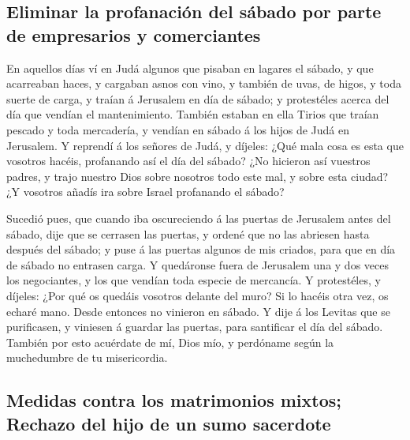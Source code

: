 \hypertarget{eliminar-la-profanaciuxf3n-del-suxe1bado-por-parte-de-empresarios-y-comerciantes}{%
\subsection{Eliminar la profanación del sábado por parte de empresarios
y
comerciantes}\label{eliminar-la-profanaciuxf3n-del-suxe1bado-por-parte-de-empresarios-y-comerciantes}}

 En aquellos días ví en Judá algunos que pisaban en lagares
el sábado, y que acarreaban haces, y cargaban asnos con vino, y también
de uvas, de higos, y toda suerte de carga, y traían á Jerusalem en día
de sábado; y protestéles acerca del día que vendían el mantenimiento.
 También estaban en ella Tirios que traían pescado y toda
mercadería, y vendían en sábado á los hijos de Judá en Jerusalem.
 Y reprendí á los señores de Judá, y díjeles: ¿Qué mala
cosa es esta que vosotros hacéis, profanando así el día del sábado?
 ¿No hicieron así vuestros padres, y trajo nuestro Dios
sobre nosotros todo este mal, y sobre esta ciudad? ¿Y vosotros añadís
ira sobre Israel profanando el sábado?

 Sucedió pues, que cuando iba oscureciendo á las puertas de
Jerusalem antes del sábado, dije que se cerrasen las puertas, y ordené
que no las abriesen hasta después del sábado; y puse á las puertas
algunos de mis criados, para que en día de sábado no entrasen carga.
 Y quedáronse fuera de Jerusalem una y dos veces los
negociantes, y los que vendían toda especie de mercancía. 
Y protestéles, y díjeles: ¿Por qué os quedáis vosotros delante del muro?
Si lo hacéis otra vez, os echaré mano. Desde entonces no vinieron en
sábado.  Y dije á los Levitas que se purificasen, y
viniesen á guardar las puertas, para santificar el día del sábado.
También por esto acuérdate de mí, Dios mío, y perdóname según la
muchedumbre de tu misericordia.

\hypertarget{medidas-contra-los-matrimonios-mixtos-rechazo-del-hijo-de-un-sumo-sacerdote}{%
\subsection{Medidas contra los matrimonios mixtos; Rechazo del hijo de
un sumo
sacerdote}\label{medidas-contra-los-matrimonios-mixtos-rechazo-del-hijo-de-un-sumo-sacerdote}}

